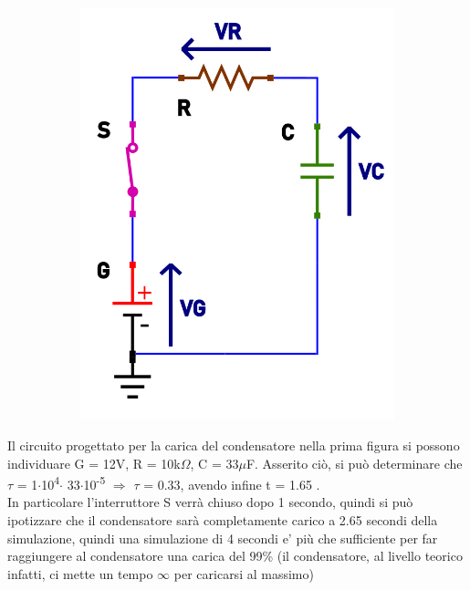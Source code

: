 \documentclass[12pt]{article}
\begin{document}
\begin{figure}[h!]
\begin{subfigure}[b]{0.347\linewidth}
    \includegraphics[width=\linewidth]{data/carica-tensioni.png}
  \end{subfigure}
\end{figure}

Il circuito progettato per la carica del condensatore nella prima figura si possono individuare G = 12V, R = 10k$\Omega$, C = 33$\mu$F. Asserito ciò, si può determinare che 
$\tau$ = 1$\cdot$10\textsuperscript{4}$\cdot$ 33$\cdot$10\textsuperscript{-5} $\Rightarrow$ $\tau$ = 0.33, avendo infine t = 1.65 . \\
In particolare l'interruttore S verrà chiuso dopo 1 secondo, quindi si può ipotizzare che il condensatore sarà completamente carico a 2.65 secondi della simulazione, quindi una simulazione di 4 secondi e' più che sufficiente per far raggiungere al condensatore una carica del 99\% (il condensatore, al livello teorico infatti, ci mette un tempo $\infty$ per caricarsi al massimo)
\end{document}
